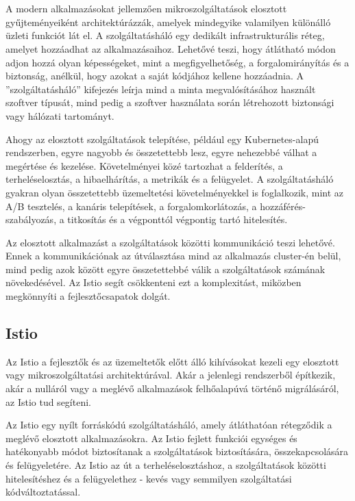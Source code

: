 \chapter{\istio}
A modern alkalmazásokat jellemzően mikroszolgáltatások elosztott gyűjteményeiként architektúrázzák, amelyek mindegyike valamilyen különálló üzleti funkciót lát el.
A szolgáltatásháló egy dedikált infrastrukturális réteg, amelyet hozzáadhat az alkalmazásaihoz.
Lehetővé teszi, hogy átlátható módon adjon hozzá olyan képességeket, mint a megfigyelhetőség, a forgalomirányítás és a biztonság, anélkül, hogy azokat a saját kódjához kellene hozzáadnia.
A ''szolgáltatásháló'' kifejezés leírja mind a minta megvalósításához használt szoftver típusát, mind pedig a szoftver használata során létrehozott biztonsági vagy hálózati tartományt.

Ahogy az elosztott szolgáltatások telepítése, például egy Kubernetes-alapú rendszerben, egyre nagyobb és összetettebb lesz, egyre nehezebbé válhat a megértése és kezelése. Követelményei közé tartozhat a felderítés, a terheléselosztás, a hibaelhárítás, a metrikák és a felügyelet.
A szolgáltatásháló gyakran olyan összetettebb üzemeltetési követelményekkel is foglalkozik, mint az A/B tesztelés, a kanáris telepítések, a forgalomkorlátozás, a hozzáférés-szabályozás, a titkosítás és a végponttól végpontig tartó hitelesítés.

Az elosztott alkalmazást a szolgáltatások közötti kommunikáció teszi lehetővé.
Ennek a kommunikációnak az útválasztása mind az alkalmazás cluster-én belül, mind pedig azok között egyre összetettebbé válik a szolgáltatások számának növekedésével.
Az Istio segít csökkenteni ezt a komplexitást, miközben megkönnyíti a fejlesztőcsapatok dolgát.

\section{Istio}
Az Istio a fejlesztők és az üzemeltetők előtt álló kihívásokat kezeli egy elosztott vagy mikroszolgáltatási architektúrával.
Akár a jelenlegi rendszerből építkezik, akár a nulláról vagy a meglévő alkalmazások felhőalapúvá történő migrálásáról, az Istio tud segíteni.

Az Istio egy nyílt forráskódú szolgáltatásháló, amely átláthatóan rétegződik a meglévő elosztott alkalmazásokra.
Az Istio fejlett funkciói egységes és hatékonyabb módot biztosítanak a szolgáltatások biztosítására, összekapcsolására és felügyeletére.
Az Istio az út a terheléselosztáshoz, a szolgáltatások közötti hitelesítéshez és a felügyelethez - kevés vagy semmilyen szolgáltatási kódváltoztatással.


